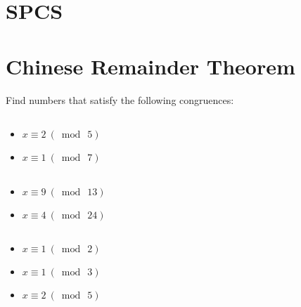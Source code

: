 \documentclass[12pt]{article}
\begin{document}
 

\section{SPCS}

\subsection{}

\section{Chinese Remainder Theorem}

Find numbers that satisfy the following congruences:

\subsection{}

\begin{itemize}
\item $x \equiv 2 ~(\bmod~5)$
\item $x \equiv 1 ~(\bmod~7)$
\end{itemize}


\subsection{}

\begin{itemize}
\item $x \equiv 9 ~(\bmod~13)$
\item $x \equiv 4 ~(\bmod~24)$
\end{itemize}


\subsection{}

\begin{itemize}
\item $x \equiv 1 ~(\bmod~2)$
\item $x \equiv 1 ~(\bmod~3)$
\item $x \equiv 2 ~(\bmod~5)$
\end{itemize}


\subsection{}
\end{document}
